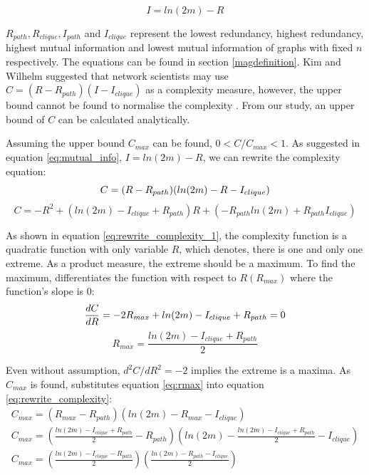 \documentclass[12pt]{article}
\begin{document}
\begin{equation}
    \label{eq:mutual_info}
    I = ln(2m)-R
\end{equation}
\par
$R_{path},R_{clique},I_{path}$ and $I_{clique}$ represent the lowest redundancy, highest redundancy, highest mutual information and lowest mutual information of graphs with fixed $n$ respectively. The equations can be found in section \ref{magdefinition}. Kim and Wilhelm suggested that network scientists may use $C=(R-R_{path})(I-I_{clique})$ as a complexity measure, however, the upper bound cannot be found to normalise the complexity \cite{KIM20082637}. From our study, an upper bound of $C$ can be calculated analytically.\par
Assuming the upper bound $C_{max}$ can be found, $0<C/C_{max}<1$. As suggested in equation \ref{eq:mutual_info}, $I = ln(2m)-R$, we can rewrite the complexity equation:\\
\begin{equation}
    \label{eq:rewrite_complexity}
     C = (R-R_{path})(ln(2m)-R-I_{clique})\\
\end{equation}
\begin{equation}
    \label{eq:rewrite_complexity_1}
    C = -R^2+(ln(2m)-I_{clique}+R_{path})R+(-R_{path}ln(2m)+R_{path}I_{clique})
\end{equation}
\par
As shown in equation \ref{eq:rewrite_complexity_1}, the complexity function is a quadratic function with only variable $R$, which denotes, there is one and only one extreme. As a product measure, the extreme should be a maximum. To find the maximum, differentiates the function with respect to $R(R_{max})$ where the function's slope is 0:
\begin{equation}
    \label{eq:mari_diff}
        \frac{dC}{dR} = -2R_{max}+ln(2m)-I_{clique}+R_{path} = 0\\
\end{equation}
\begin{equation}
    \label{eq:rmax}
    R_{max} = \frac{ln(2m)-I_{clique}+R_{path}}{2}
\end{equation}
\par
Even without assumption, $d^2C/dR^2 = -2$ implies the extreme is a maxima. As $C_{max}$ is found, substitutes equation \ref{eq:rmax} into equation \ref{eq:rewrite_complexity}:\\
\begin{equation}
    \begin{gathered}
        C_{max} =(R_{max}-R_{path})(ln(2m)-R_{max}-I_{clique})\\
        C_{max} = (\frac{ln(2m)-I_{clique}+R_{path}}{2}-R_{path})(ln(2m)-\frac{ln(2m)-I_{clique}+R_{path}}{2}-I_{clique})\\
        C_{max} = (\frac{ln(2m)-I_{clique}-R_{path}}{2})(\frac{ln(2m)-R_{path}-I_{clique}}{2})\\
    \end{gathered}
\end{equation}
\end{document}
